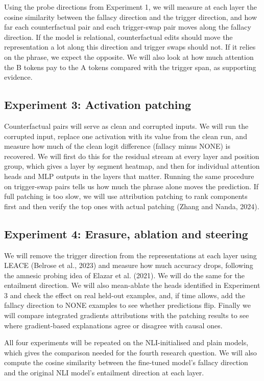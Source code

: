 \documentclass[11pt,a4paper]{article}
\begin{document}
Using the probe directions from Experiment 1, we will measure at each layer the cosine similarity between the fallacy direction and the trigger direction, and how far each counterfactual pair and each trigger-swap pair moves along the fallacy direction. If the model is relational, counterfactual edits should move the representation a lot along this direction and trigger swaps should not. If it relies on the phrase, we expect the opposite. We will also look at how much attention the B tokens pay to the A tokens compared with the trigger span, as supporting evidence.

\subsection{Experiment 3: Activation patching}

Counterfactual pairs will serve as clean and corrupted inputs. We will run the corrupted input, replace one activation with its value from the clean run, and measure how much of the clean logit difference (fallacy minus NONE) is recovered. We will first do this for the residual stream at every layer and position group, which gives a layer by segment heatmap, and then for individual attention heads and MLP outputs in the layers that matter. Running the same procedure on trigger-swap pairs tells us how much the phrase alone moves the prediction. If full patching is too slow, we will use attribution patching to rank components first and then verify the top ones with actual patching (Zhang and Nanda, 2024).

\subsection{Experiment 4: Erasure, ablation and steering}

We will remove the trigger direction from the representations at each layer using LEACE (Belrose et al., 2023) and measure how much accuracy drops, following the amnesic probing idea of Elazar et al. (2021). We will do the same for the entailment direction. We will also mean-ablate the heads identified in Experiment 3 and check the effect on real held-out examples, and, if time allows, add the fallacy direction to NONE examples to see whether predictions flip. Finally we will compare integrated gradients attributions with the patching results to see where gradient-based explanations agree or disagree with causal ones.

All four experiments will be repeated on the NLI-initialised and plain models, which gives the comparison needed for the fourth research question. We will also compute the cosine similarity between the fine-tuned model's fallacy direction and the original NLI model's entailment direction at each layer.
\end{document}
